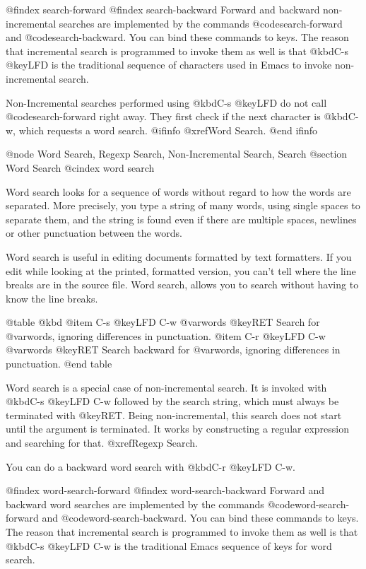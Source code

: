 {{{{@findex search-forward
@findex search-backward
  Forward and backward non-incremental searches are implemented by the
commands @code{search-forward} and @code{search-backward}.  You can bind
these commands to keys.  The reason that incremental
search is programmed to invoke them as well is that @kbd{C-s @key{LFD}}
is the traditional sequence of characters used in Emacs to invoke
non-incremental search.

 Non-Incremental searches performed using @kbd{C-s @key{LFD}} do
not call @code{search-forward} right away.  They first check
if the next character is @kbd{C-w}, which requests a word search.
@ifinfo
@xref{Word Search}.
@end ifinfo

@node Word Search, Regexp Search, Non-Incremental Search, Search
@section Word Search
@cindex word search

  Word search looks for a sequence of words without regard to how the
words are separated.  More precisely, you type a string of many words,
using single spaces to separate them, and the string is found even if
there are multiple spaces, newlines or other punctuation between the words.

  Word search is useful in editing documents formatted by text formatters.
If you edit while looking at the printed, formatted version, you can't tell
where the line breaks are in the source file.  Word search, allows you
to search  without having to know the line breaks.

@table @kbd
@item C-s @key{LFD} C-w @var{words} @key{RET}
Search for @var{words}, ignoring differences in punctuation.
@item C-r @key{LFD} C-w @var{words} @key{RET}
Search backward for @var{words}, ignoring differences in punctuation.
@end table

  Word search is a special case of non-incremental search.  It is invoked
with @kbd{C-s @key{LFD} C-w} followed by the search string, which
must always be terminated with @key{RET}.  Being non-incremental, this
search does not start until the argument is terminated.  It works by
constructing a regular expression and searching for that.  @xref{Regexp
Search}.

 You can do a backward word search with @kbd{C-r @key{LFD} C-w}.

@findex word-search-forward
@findex word-search-backward
  Forward and backward word searches are implemented by the commands
@code{word-search-forward} and @code{word-search-backward}.  You can
bind these commands to keys.  The reason that incremental
search is programmed to invoke them as well is that @kbd{C-s @key{LFD} C-w}
is the traditional Emacs sequence of keys for word search.

}}}}
